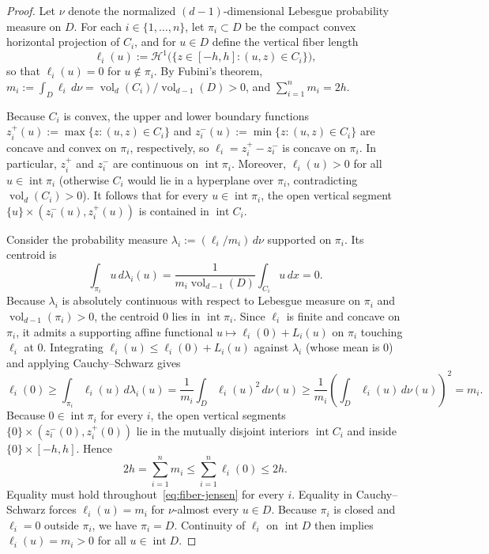 \documentclass[11pt,a4paper]{amsart}
\numberwithin{equation}{section}
\theoremstyle{definition}
\newcommand{\inte}{\operatorname{int}}
\newcommand{\vol}{\operatorname{vol}}
\begin{document}
\begin{proof}
Let $\nu$ denote the normalized $(d-1)$-dimensional Lebesgue probability measure on $D$. For each $i \in \{1,\dots,n\}$, let $\pi_i \subset D$ be the compact convex horizontal projection of $C_i$, and for $u \in D$ define the vertical fiber length
\[
\ell_i(u) := \mathcal{H}^1\bigl(\{z \in [-h,h] : (u,z) \in C_i\}\bigr),
\]
so that $\ell_i(u) = 0$ for $u \notin \pi_i$. By Fubini's theorem, $m_i := \int_D \ell_i \, d\nu = \vol_d(C_i)/\vol_{d-1}(D) > 0$, and $\sum_{i=1}^n m_i = 2h$.

Because $C_i$ is convex, the upper and lower boundary functions $z_i^+(u) := \max\{z : (u,z) \in C_i\}$ and $z_i^-(u) := \min\{z : (u,z) \in C_i\}$ are concave and convex on $\pi_i$, respectively, so $\ell_i = z_i^+ - z_i^-$ is concave on $\pi_i$. In particular, $z_i^+$ and $z_i^-$ are continuous on $\inte \pi_i$. Moreover, $\ell_i(u) > 0$ for all $u \in \inte \pi_i$ (otherwise $C_i$ would lie in a hyperplane over $\pi_i$, contradicting $\vol_d(C_i) > 0$). It follows that for every $u \in \inte \pi_i$, the open vertical segment $\{u\} \times (z_i^-(u), z_i^+(u))$ is contained in $\inte C_i$.

Consider the probability measure $\lambda_i := (\ell_i / m_i)\, d\nu$ supported on $\pi_i$. Its centroid is
\[
\int_{\pi_i} u \, d\lambda_i(u) = \frac{1}{m_i \vol_{d-1}(D)} \int_{C_i} u \, dx = 0.
\]
Because $\lambda_i$ is absolutely continuous with respect to Lebesgue measure on $\pi_i$ and $\vol_{d-1}(\pi_i) > 0$, the centroid $0$ lies in $\inte \pi_i$. Since $\ell_i$ is finite and concave on $\pi_i$, it admits a supporting affine functional $u \mapsto \ell_i(0) + L_i(u)$ on $\pi_i$ touching $\ell_i$ at $0$. Integrating $\ell_i(u) \le \ell_i(0) + L_i(u)$ against $\lambda_i$ (whose mean is $0$) and applying Cauchy--Schwarz gives
\begin{equation}
\label{eq:fiber-jensen}
\ell_i(0) \ge \int_{\pi_i} \ell_i(u) \, d\lambda_i(u) = \frac{1}{m_i} \int_D \ell_i(u)^2 \, d\nu(u) \ge \frac{1}{m_i} \left(\int_D \ell_i(u)\, d\nu(u)\right)^2 = m_i.
\end{equation}
Because $0 \in \inte \pi_i$ for every $i$, the open vertical segments $\{0\} \times (z_i^-(0), z_i^+(0))$ lie in the mutually disjoint interiors $\inte C_i$ and inside $\{0\} \times [-h, h]$. Hence
\[
2h = \sum_{i=1}^n m_i \le \sum_{i=1}^n \ell_i(0) \le 2h.
\]
Equality must hold throughout~\eqref{eq:fiber-jensen} for every $i$. Equality in Cauchy--Schwarz forces $\ell_i(u) = m_i$ for $\nu$-almost every $u \in D$. Because $\pi_i$ is closed and $\ell_i = 0$ outside $\pi_i$, we have $\pi_i = D$. Continuity of $\ell_i$ on $\inte D$ then implies $\ell_i(u) = m_i > 0$ for all $u \in \inte D$.


\end{proof}
\end{document}
